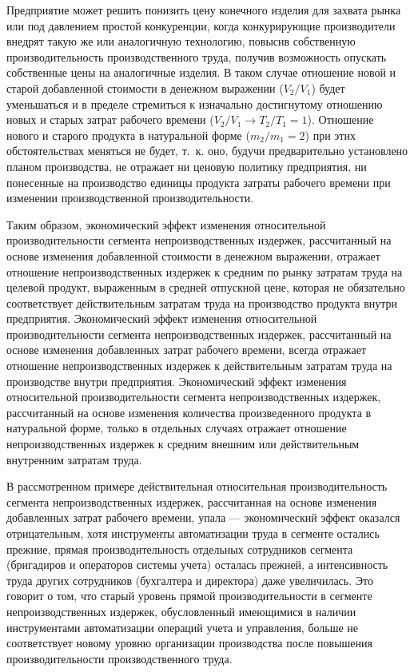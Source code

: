 \documentclass{article}
\begin{document}
Предприятие может решить понизить цену конечного изделия для захвата рынка или под давлением простой конкуренции, когда конкурирующие производители внедрят такую же или аналогичную технологию, повысив собственную производительность производственного труда, получив возможность опускать собственные цены на аналогичные изделия. В таком случае отношение новой и старой добавленной стоимости в денежном выражении ($V_2 / V_1$) будет уменьшаться и в пределе стремиться к изначально достигнутому отношению новых и старых затрат рабочего времени ($V_2 / V_1 \to T_2 / T_1 = 1$). Отношение нового и старого продукта в натуральной форме ($m_2 / m_1 = 2$) при этих обстоятельствах меняться не будет, т.~к. оно, будучи предварительно установлено планом производства, не отражает ни ценовую политику предприятия, ни понесенные на производство единицы продукта затраты рабочего времени при изменении производственной производительности.

Таким образом, экономический эффект изменения относительной производительности сегмента непроизводственных издержек, рассчитанный на основе изменения добавленной стоимости в денежном выражении, отражает отношение непроизводственных издержек к средним по рынку затратам труда на целевой продукт, выраженным в средней отпускной цене, которая не обязательно соответствует действительным затратам труда на производство продукта внутри предприятия. Экономический эффект изменения относительной производительности сегмента непроизводственных издержек, рассчитанный на основе изменения добавленных затрат рабочего времени, всегда отражает отношение непроизводственных издержек к действительным затратам труда на производстве внутри предприятия. Экономический эффект изменения относительной производительности сегмента непроизводственных издержек, рассчитанный на основе изменения количества произведенного продукта в натуральной форме, только в отдельных случаях отражает отношение непроизводственных издержек к средним внешним или действительным внутренним затратам труда.

В рассмотренном примере действительная относительная производительность сегмента непроизводственных издержек, рассчитанная на основе изменения добавленных затрат рабочего времени, упала — экономический эффект оказался отрицательным, хотя инструменты автоматизации труда в сегменте остались прежние, прямая производительность отдельных сотрудников сегмента (бригадиров и операторов системы учета) осталась прежней, а интенсивность труда других сотрудников (бухгалтера и директора) даже увеличилась. Это говорит о том, что старый уровень прямой производительности в сегменте непроизводственных издержек, обусловленный имеющимися в наличии инструментами автоматизации операций учета и управления, больше не соответствует новому уровню организации производства после повышения производительности производственного труда.
\end{document}

